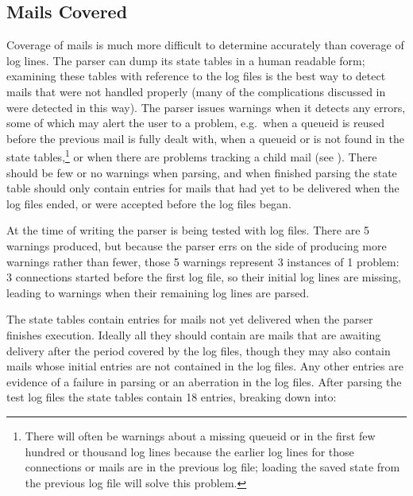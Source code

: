 \newpage{} %

\subsection{Mails Covered}

\label{mails-covered}

Coverage of mails is much more difficult to determine accurately than
coverage of log lines.  The parser can dump its state tables in a human
readable form; examining these tables with reference to the log files is
the best way to detect mails that were not handled properly (many of the
complications discussed in  were detected in this
way).  The parser issues warnings when it detects any errors, some of which
may alert the user to a problem, e.g.\ when a queueid is reused before the
previous mail is fully dealt with, when a queueid or  is not
found in the state tables,\footnote{There will often be warnings about a
missing queueid or  in the first few hundred or thousand log
lines because the earlier log lines for those connections or mails are in
the previous log file; loading the saved state from the previous log file
will solve this problem.} or when there are problems tracking a child mail
(see ).  There should be few or no
warnings when parsing, and when finished parsing the state table should
only contain entries for mails that had yet to be delivered when the log
files ended, or were accepted before the log files began.

At the time of writing the parser is being tested with \numberOFlogFILES{}
log files.  There are 5 warnings produced, but because the parser errs on
the side of producing more warnings rather than fewer, those 5 warnings
represent 3 instances of 1 problem: 3 connections started before the first
log file, so their initial log lines are missing, leading to warnings when
their remaining log lines are parsed.

The state tables contain entries for mails not yet delivered when the
parser finishes execution.  Ideally all they should contain are mails that
are awaiting delivery after the period covered by the log files, though
they may also contain mails whose initial entries are not contained in the
log files.  Any other entries are evidence of a failure in parsing or an
aberration in the log files.  After parsing the \numberOFlogFILES{} test
log files the state tables contain 18 entries, breaking down into:

